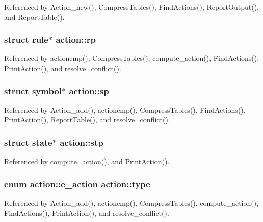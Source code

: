 Referenced by Action\-\_\-new(), Compress\-Tables(), Find\-Actions(), Report\-Output(), and Report\-Table().

\hypertarget{structaction_af3ef54d83f6ee6fabe6200fff85e60be}{
\subsubsection[{rp}]{\setlength{\rightskip}{0pt plus 5cm}struct {\bf rule}$\ast$ action\-::rp}}\label{structaction_af3ef54d83f6ee6fabe6200fff85e60be}


Referenced by actioncmp(), Compress\-Tables(), compute\-\_\-action(), Find\-Actions(), Print\-Action(), and resolve\-\_\-conflict().

\hypertarget{structaction_a8bb419de6aa7116057d284c32003e623}{
\subsubsection[{sp}]{\setlength{\rightskip}{0pt plus 5cm}struct {\bf symbol}$\ast$ action\-::sp}}\label{structaction_a8bb419de6aa7116057d284c32003e623}


Referenced by Action\-\_\-add(), actioncmp(), Compress\-Tables(), Find\-Actions(), Print\-Action(), Report\-Table(), and resolve\-\_\-conflict().

\hypertarget{structaction_a5642dd2fd42e8fcd1dbe242e7a9386ce}{
\subsubsection[{stp}]{\setlength{\rightskip}{0pt plus 5cm}struct {\bf state}$\ast$ action\-::stp}}\label{structaction_a5642dd2fd42e8fcd1dbe242e7a9386ce}


Referenced by compute\-\_\-action(), and Print\-Action().

\hypertarget{structaction_a0f5ddfb1ec3fc9f2da9f2c707defbe0d}{
\subsubsection[{type}]{\setlength{\rightskip}{0pt plus 5cm}enum {\bf action\-::e\-\_\-action}  action\-::type}}\label{structaction_a0f5ddfb1ec3fc9f2da9f2c707defbe0d}


Referenced by Action\-\_\-add(), actioncmp(), Compress\-Tables(), compute\-\_\-action(), Find\-Actions(), Print\-Action(), and resolve\-\_\-conflict().

